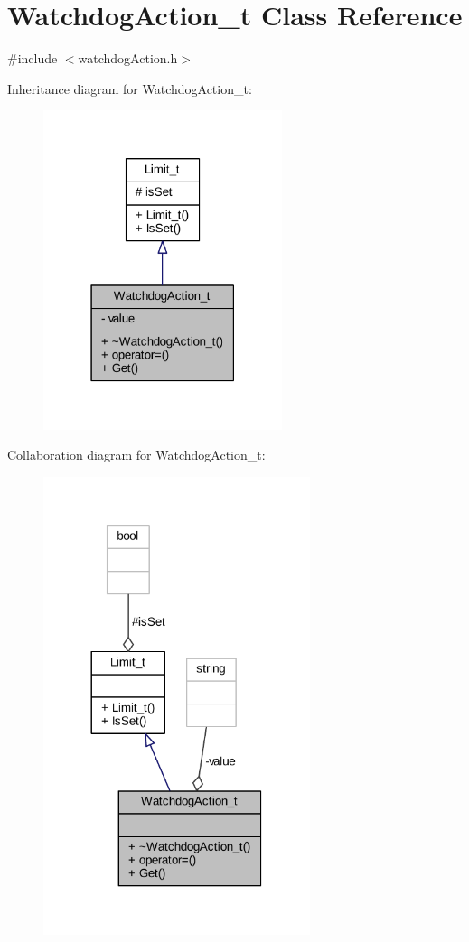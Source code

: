\hypertarget{class_watchdog_action__t}{}\section{Watchdog\+Action\+\_\+t Class Reference}
\label{class_watchdog_action__t}


{\ttfamily \#include $<$watchdog\+Action.\+h$>$}



Inheritance diagram for Watchdog\+Action\+\_\+t\+:
\nopagebreak
\begin{figure}[H]
\begin{center}
\leavevmode
\includegraphics[width=198pt]{class_watchdog_action__t__inherit__graph}
\end{center}
\end{figure}


Collaboration diagram for Watchdog\+Action\+\_\+t\+:
\nopagebreak
\begin{figure}[H]
\begin{center}
\leavevmode
\includegraphics[width=221pt]{class_watchdog_action__t__coll__graph}
\end{center}
\end{figure}
